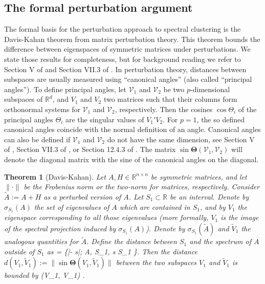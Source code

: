 \documentclass{article}
\def\ba#1\ea{\begin{align*}#1\end{align*}} %
\newtheorem{theorem}[lemma]{Theorem}
\newcommand{\RR}{\mathbb{R}}
\newcommand{\R}{\RR}
\newcommand{\Vcal}{\mathcal{V}}
\newcommand{\norm}[1][\cdot]{\|#1\|}
\begin{document}
%
\subsection{The formal perturbation argument} 
%

The formal basis for the perturbation approach to spectral clustering is the 
Davis-Kahan theorem from matrix perturbation theory. This theorem
bounds the difference between eigenspaces of symmetric matrices under
perturbations. We state those results for completeness, but for
background reading we refer to Section V of  and
Section VII.3 of .
%
In perturbation theory, distances between subspaces are usually
measured using ``canonical angles'' (also called ``principal
angles''). To define principal angles, let $\Vcal_1$ and $\Vcal_2$ be
two $p$-dimensional subspaces of $\R^d$, and $V_1$ and $V_2$ two
matrices such that their columns form orthonormal systems for
$\Vcal_1$ and $\Vcal_2$, respectively. Then the cosines $\cos
\Theta_i$ of the principal angles $\Theta_i$ are the singular values
of $V_1'V_2$.  For $p=1$, the so defined canonical angles coincide
with the normal definition of an angle. Canonical angles can also be
defined if $\Vcal_1$ and $\Vcal_2$ do not have the same dimension, see
Section V of , Section VII.3 of , or
Section 12.4.3 of . The matrix $\sin \mathbf
\Theta(\Vcal_1, \Vcal_2)$ will denote the diagonal matrix with the sine of the 
canonical angles on the diagonal.



\begin{theorem}[Davis-Kahan]
Let $A, H \in \R^{n \times n}$ be symmetric matrices, and let
$\norm[\cdot]$ be the Frobenius norm or the two-norm for
matrices, respectively. Consider $\tilde A := A + H$ as a perturbed version of $A$. 
Let $S_1 \subset \R$ be an interval. Denote by $\sigma_{S_1}(A)$ the set of
eigenvalues of $A$ which are contained in $S_1$, and by $V_1$ the
eigenspace corresponding to all those eigenvalues (more formally,
$V_1$ is the image of the spectral projection induced by
$\sigma_{S_1}(A)$). 
%
Denote by 
$\sigma_{S_1}(\tilde A)$ and $\tilde V_1$ the analogous quantities for $\tilde A$. 
%
Define the distance between $S_1$ and the spectrum of $A$ outside of
$S_1$ as 
\ba \delta = \min \{|\lambda - s|; \; \lambda {}A, \; \lambda \not\in S_1, \; s \in S_1 \}.  \ea 
%
Then the distance $d(V_1,\tilde V_1):=
\norm[\sin \mathbf \Theta(V_1,\tilde V_1) ]$ between the two subspaces
 $V_1$ and $\tilde V_1$ is bounded by 
\ba
d(V_1, \tilde V_1) \leq \frac{\norm[H]}{\delta}. 
\ea
\end{theorem}
\end{document}
